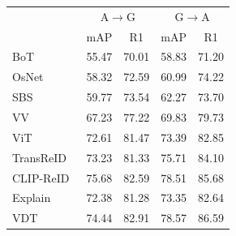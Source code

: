 \documentclass[runningheads]{llncs}
\makeatletter
\let\leaderboards@table\table
\let\leaderboards@endtable\endtable
\renewenvironment{table}[1][]{\leaderboards@table[H]}{\leaderboards@endtable}
\makeatother
\begin{document}
\begin{table}[t]
  \caption{\textbf{Performance comparison on AG-ReID v1.}
    Best results are in \textbf{bold}.}
  \label{tab:sota_agreidv1}
  \centering
  \begin{tabular}{lcccc}
    \Xhline{1.0pt}
    \multirow{2}{*}{Method}
                                       & \multicolumn{2}{c}{A$\rightarrow$G}
                                       & \multicolumn{2}{c}{G$\rightarrow$A}                                                                             \\
    \cmidrule(lr){2-3}\cmidrule(lr){4-5}
                                       & \multicolumn{1}{c}{mAP}             & \multicolumn{1}{c}{R1} & \multicolumn{1}{c}{mAP} & \multicolumn{1}{c}{R1} \\
    \Xhline{0.6pt}
    BoT~\cite{luo2019bag}              & 55.47                               & 70.01                  & 58.83                   & 71.20                  \\
    OsNet~\cite{zhou2021learning}      & 58.32                               & 72.59                  & 60.99                   & 74.22                  \\
    SBS~\cite{he2023fastreid}          & 59.77                               & 73.54                  & 62.27                   & 73.70                  \\
    VV~\cite{kumar2020strong}          & 67.23                               & 77.22                  & 69.83                   & 79.73                  \\
    \Xhline{0.6pt}
    ViT~\cite{dosovitskiyimage}        & 72.61                               & 81.47                  & 73.39                   & 82.85                  \\
    TransReID~\cite{he2021transreid}   & 73.23                               & 81.33                  & 75.71                   & 84.10                  \\
    CLIP-ReID~\cite{li2023clip}        & 75.68                               & 82.59                  & 78.51                   & 85.68                  \\
    \Xhline{0.6pt}
    Explain~\cite{nguyen2023aerial}    & 72.38                               & 81.28                  & 73.35                   & 82.64                  \\
    VDT~\cite{zhang2024view}           & 74.44                               & 82.91                  & 78.57                   & 86.59                  \\

\end{tabular}
\end{table}
\end{document}
